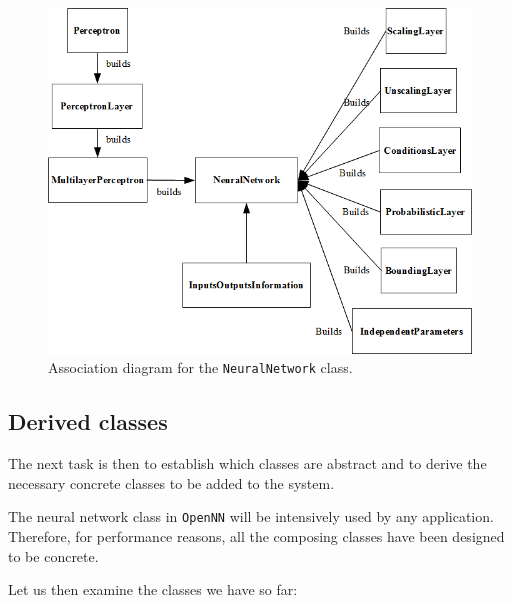 \begin{figure}[h!]
\begin{center}
\includegraphics[width=1.1\textwidth]{neural_network/association_diagram}
\caption{Association diagram for the \lstinline'NeuralNetwork' class.}\label{NeuralNetworkAssociationDiagram}
\end{center}
\end{figure}

\subsection*{Derived classes}

The next task is then to establish which classes are abstract and
to derive the necessary concrete classes to be added to the
system. 

The neural network class in \texttt{OpenNN} will be intensively used by any application. 
Therefore, for performance reasons, all the composing classes have been designed to be concrete. 

Let us then examine the classes we have so far:

